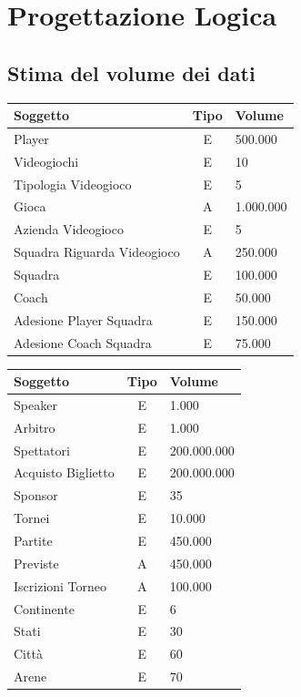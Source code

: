 \documentclass[a4paper,12pt]{report}
\begin{document}
\chapter{Progettazione Logica}
\section{Stima del volume dei dati}
\renewcommand{\arraystretch}{1.5} %
\setlength{\arrayrulewidth}{0.5mm}%
\setlength{\tabcolsep}{10pt}%
\setlength\doublerulesep{0.15cm}%

\begin{tabular}{|m{2cm}|c|m{2cm}|}
	\hline\rowcolor{pink}
	Soggetto & Tipo & Volume\\
	\hline\hline
	
	Player & E & 500.000\\
	\hline
	Videogiochi & E & 10\\
	\hline
	Tipologia Videogioco & E & 5\\
	\hline
	Gioca & A & 1.000.000\\
	\hline
	Azienda Videogioco & E & 5\\
	\hline
	 Squadra Riguarda Videogioco & A & 250.000\\
	
	\hline
	\hline
	
	Squadra & E & 100.000\\
	\hline
	Coach & E & 50.000\\
	\hline
	Adesione Player Squadra& E & 150.000\\ 
	\hline
	Adesione Coach Squadra& E & 75.000\\ 
	
	\hline
\end{tabular}
\setlength\doublerulesep{0.28cm} %
\begin{tabular}{|m{2cm}|c|m{2cm}|}
	\hline\rowcolor{pink}
	Soggetto & Tipo & Volume\\
	\hline\hline
	Speaker & E & 1.000\\
	\hline
	Arbitro & E & 1.000\\
	\hline
	Spettatori & E & 200.000.000\\
	\hline
	Acquisto Biglietto & E & 200.000.000\\ 
	\hline
	Sponsor & E & 35\\
	
	\hline\hline
	
	Tornei & E & 10.000\\
	\hline
	Partite & E & 450.000\\
	\hline
	Previste & A & 450.000\\ 
	\hline
	Iscrizioni Torneo & A & 100.000\\ 
	\hline
	
	\hline\hline
	
	Continente & E & 6\\
	\hline
	Stati & E & 30\\
	\hline
	Città & E & 60\\ 
	\hline
	Arene & E & 70\\ 
	\hline
	
	
\end{tabular}
\end{document}

